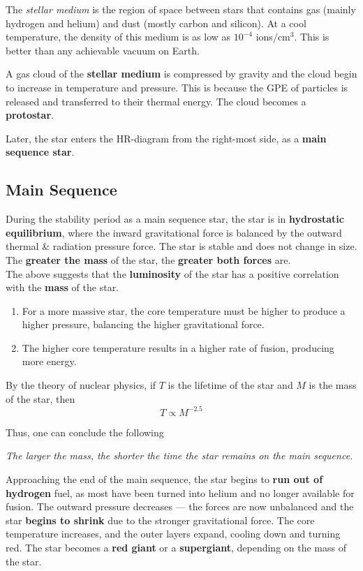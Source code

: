\documentclass[a4paper,12pt]{article}
\newcommand{\lb}{\\[8pt]}
\begin{document}
The \textit{stellar medium} is the region of space between stars that contains gas (mainly hydrogen and helium) and dust (mostly carbon and silicon). At a cool temperature, the density of this medium is as low as $10^{-4}$ ions$/$cm$^3$. This is better than any achievable vacuum on Earth.

A gas cloud of the \textbf{stellar medium} is compressed by gravity and the cloud begin to increase in temperature and pressure. This is because the GPE of particles is released and transferred to their thermal energy. The cloud becomes a \textbf{protostar}.

Later, the star enters the HR-diagram from the right-most side, as a \textbf{main sequence star}.

\subsection{Main Sequence}

During the stability period as a main sequence star, the star is in \textbf{hydrostatic equilibrium}, where the inward gravitational force is balanced by the outward thermal \& radiation pressure force. The star is stable and does not change in size. The \textbf{greater the mass} of the star, the \textbf{greater both forces} are.\lb
The above suggests that the \textbf{luminosity} of the star has a positive correlation with the \textbf{mass} of the star.
\begin{enumerate}
  \item For a more massive star, the core temperature must be higher to produce a higher pressure, balancing the higher gravitational force.
  \item The higher core temperature results in a higher rate of fusion, producing more energy.
\end{enumerate}

\pagebreak

By the theory of nuclear physics, if $T$ is the lifetime of the star and $M$ is the mass of the star, then
$$T\propto M^{-2.5}$$

Thus, one can conclude the following

\begin{center}
  \textit{The larger the mass, the shorter the time the star remains on the main sequence.}
\end{center}

Approaching the end of the main sequence, the star begins to \textbf{run out of hydrogen} fuel, as most have been turned into helium and no longer available for fusion. The outward pressure decreases --- the forces are now unbalanced and the star \textbf{begins to shrink} due to the stronger gravitational force. The core temperature increases, and the outer layers expand, cooling down and turning red. The star becomes a \textbf{red giant} or a \textbf{supergiant}, depending on the mass of the star.
\end{document}
